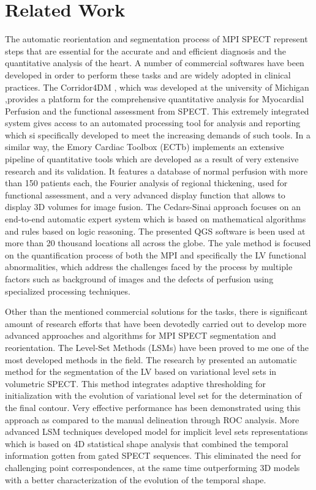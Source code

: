 \chapter{Related Work}
\label{ch:related}

The automatic reorientation and segmentation process of MPI SPECT represent steps that are essential for the accurate and and efficient diagnosis and the quantitative analysis of the heart. A number of commercial softwares have been developed in order to perform these tasks and are widely adopted in clinical practices. The Corridor4DM \cite{FICARO2007455}, which was developed at the university of Michigan ,provides a platform for the comprehensive quantitative analysis for Myocardial Perfusion and the functional assessment from SPECT. This extremely integrated system gives access to an automated processing tool for analysis and reporting which si specifically developed to meet the increasing demands of such tools. In a similar way, the Emory Cardiac Toolbox (ECTb) \cite{GARCIA2007420} implements an extensive pipeline of quantitative tools which are developed as a result of very extensive research and its validation. It features a database of normal perfusion with more than 150 patients each, the Fourier analysis of regional thickening, used for functional assessment, and a very advanced display function that allows to display 3D volumes for image fusion. The Cedars-Sinai approach \cite{GERMANO2007433} focuses on an end-to-end automatic expert system which is based on mathematical algorithms and rules based on logic reasoning. The presented QGS software is been used at more than 20 thousand locations all across the globe. The yale method \cite{LIU2007483} is focused on the quantification process of both the MPI and specifically the LV functional abnormalities, which address the challenges faced by the process by multiple factors such as background of images and the defects of perfusion using specialized processing techniques.

Other than the mentioned commercial solutions for the tasks, there is significant amount of research efforts that have been devotedly carried out to develop more advanced approaches and algorithms for MPI SPECT segmentation and reorientation. The Level-Set Methods (LSMs) have been proved to me one of the most developed methods in the field. The research by \cite{DBLP:journals/cars/HosntalabMMA12} presented an automatic method for the segmentation of the LV based on variational level sets in volumetric SPECT. This method integrates adaptive thresholding for initialization with the evolution of variational level set for the determination of the final contour. Very effective performance has been demonstrated using this approach as compared to the manual delineation through ROC analysis. More advanced LSM techniques \cite{10.1007/11866565_12} developed model for implicit level sets representations which is based on 4D statistical shape analysis that combined the temporal information gotten from gated SPECT sequences. This eliminated the need for challenging point correspondences, at the same time outperforming 3D models with a better characterization of the evolution of the temporal shape.

